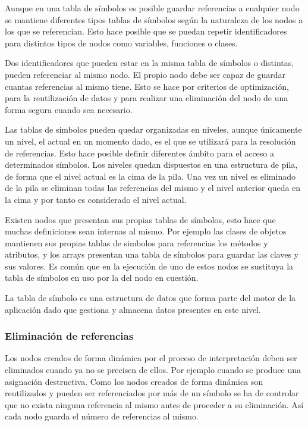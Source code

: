 Aunque en una tabla de símbolos es posible guardar referencias a cualquier nodo se mantiene diferentes tipos tablas de símbolos según la naturaleza de los nodos a los que se
referencian. Esto hace posible que se puedan repetir identificadores para distintos tipos de nodos como variables, funciones o clases.

Dos identificadores que pueden estar en la misma tabla de símbolos o distintas, pueden referenciar al mismo nodo. El propio nodo debe ser capaz de guardar cuantas referencias al 
mismo tiene. Esto se hace por criterios de optimización, para la reutilización de datos y para realizar una eliminación del nodo de una forma segura cuando sea necesario.

Las tablas de símbolos pueden quedar organizadas en niveles, aunque únicamente un nivel, el actual en un momento dado, es el que se utilizará para la resolución de referencias.
Esto hace posible definir diferentes ámbito para el acceso a determinados símbolos. Los niveles quedan dispuestos en una estructura de pila, de forma que el nivel actual es
la cima de la pila. Una vez un nivel es eliminado de la pila se eliminan todas las referencias del mismo y el nivel anterior queda en la cima y por tanto es considerado el nivel actual.

Existen nodos que presentan sus propias tablas de símbolos, esto hace que muchas definiciones sean internas al mismo. Por ejemplo las clases de objetos mantienen sus propias tablas
de simbolos para referencias los métodos y atributos, y los arrays presentan una tabla de símbolos para guardar las claves y sus valores. Es común que en la ejecución 
de uno de estos nodos se sustituya la tabla de símbolos en uso por la del nodo en cuestión.

La tabla de símbolo es una estructura de datos que forma parte del motor de la aplicación dado que gestiona y almacena datos presentes en este nivel. 

\subsubsection{Eliminación de referencias}
Los nodos creados de forma dinámica por el proceso de interpretación deben ser eliminados cuando ya no se precisen de ellos. Por ejemplo cuando se produce una asignación destructiva. Como
los nodos creados de forma dinámica son reutilizados y pueden ser referenciados por más de un símbolo se ha de controlar que no exista ninguna referencia al mismo 
antes de proceder a su eliminación. Así cada nodo guarda el número de referencias al mismo.

